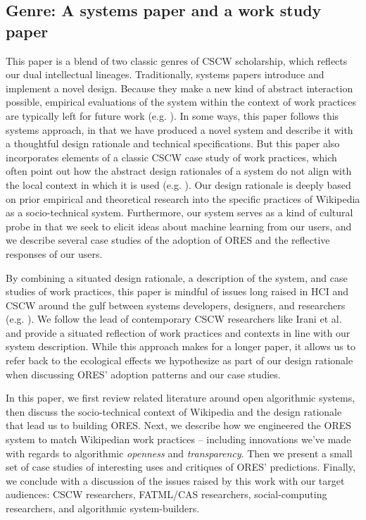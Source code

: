 \subsection{Genre: A systems paper and a work study paper}
This paper is a blend of two classic genres of CSCW scholarship, which reflects our dual intellectual lineages. Traditionally, systems papers introduce and implement a novel design. Because they make a new kind of abstract interaction possible, empirical evaluations of the system within the context of work practices are typically left for future work (e.g. \cite{resnick1994grouplens}). In some ways, this paper follows this systems approach, in that we have produced a novel system and describe it with a thoughtful design rationale and technical specifications. But this paper also incorporates elements of a classic CSCW case study of work practices, which often point out how the abstract design rationales of a system do not align with the local context in which it is used (e.g. \cite{star1994steps}). Our design rationale is deeply based on prior empirical and theoretical research into the specific practices of Wikipedia as a socio-technical system. Furthermore, our system serves as a kind of cultural probe in that we seek to elicit ideas about machine learning from our users, and we describe several case studies of the adoption of ORES and the reflective responses of our users.

By combining a situated design rationale, a description of the system, and case studies of work practices, this paper is mindful of issues long raised in HCI and CSCW around the gulf between systems developers, designers, and researchers (e.g. \cite{gentner1990good, dourish2006implications, grudin1988cscw}). We follow the lead of contemporary CSCW researchers like Irani et al.\cite{irani2013turkopticon} and provide a situated reflection of work practices and contexts in line with our system description. While this approach makes for a longer paper, it allows us to refer back to the ecological effects we hypothesize as part of our design rationale when discussing ORES' adoption patterns and our case studies.

In this paper, we first review related literature around open algorithmic systems, then discuss the socio-technical context of Wikipedia and the design rationale that lead us to building ORES.  Next, we describe how we engineered the ORES system to match Wikipedian work practices -- including innovations we've made with regards to algorithmic \emph{openness} and \emph{transparency}.  Then we present a small set of case studies of interesting uses and critiques of ORES' predictions.  Finally, we conclude with a discussion of the issues raised by this work with our target audiences: CSCW researchers, FATML/CAS researchers, social-computing researchers, and algorithmic system-builders.
